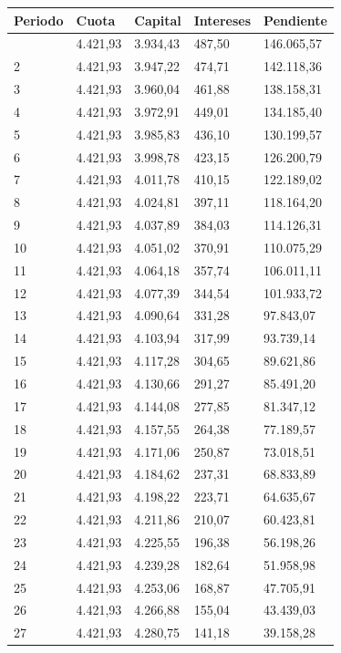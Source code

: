 \documentclass[
  letterpaper,
  DIV=11,
  numbers=noendperiod]{scrreprt}
\begin{document}
\begin{tcolorbox}
\begin{tcolorbox}
\begin{longtable}[]{@{}lllll@{}}
\toprule\noalign{}
Periodo & Cuota & Capital & Intereses & Pendiente \\
\midrule\noalign{}
\endhead
\bottomrule\noalign{}
\endlastfoot
1 & 4.421,93 & 3.934,43 & 487,50 & 146.065,57 \\
2 & 4.421,93 & 3.947,22 & 474,71 & 142.118,36 \\
3 & 4.421,93 & 3.960,04 & 461,88 & 138.158,31 \\
4 & 4.421,93 & 3.972,91 & 449,01 & 134.185,40 \\
5 & 4.421,93 & 3.985,83 & 436,10 & 130.199,57 \\
6 & 4.421,93 & 3.998,78 & 423,15 & 126.200,79 \\
7 & 4.421,93 & 4.011,78 & 410,15 & 122.189,02 \\
8 & 4.421,93 & 4.024,81 & 397,11 & 118.164,20 \\
9 & 4.421,93 & 4.037,89 & 384,03 & 114.126,31 \\
10 & 4.421,93 & 4.051,02 & 370,91 & 110.075,29 \\
11 & 4.421,93 & 4.064,18 & 357,74 & 106.011,11 \\
12 & 4.421,93 & 4.077,39 & 344,54 & 101.933,72 \\
13 & 4.421,93 & 4.090,64 & 331,28 & 97.843,07 \\
14 & 4.421,93 & 4.103,94 & 317,99 & 93.739,14 \\
15 & 4.421,93 & 4.117,28 & 304,65 & 89.621,86 \\
16 & 4.421,93 & 4.130,66 & 291,27 & 85.491,20 \\
17 & 4.421,93 & 4.144,08 & 277,85 & 81.347,12 \\
18 & 4.421,93 & 4.157,55 & 264,38 & 77.189,57 \\
19 & 4.421,93 & 4.171,06 & 250,87 & 73.018,51 \\
20 & 4.421,93 & 4.184,62 & 237,31 & 68.833,89 \\
21 & 4.421,93 & 4.198,22 & 223,71 & 64.635,67 \\
22 & 4.421,93 & 4.211,86 & 210,07 & 60.423,81 \\
23 & 4.421,93 & 4.225,55 & 196,38 & 56.198,26 \\
24 & 4.421,93 & 4.239,28 & 182,64 & 51.958,98 \\
25 & 4.421,93 & 4.253,06 & 168,87 & 47.705,91 \\
26 & 4.421,93 & 4.266,88 & 155,04 & 43.439,03 \\
27 & 4.421,93 & 4.280,75 & 141,18 & 39.158,28 \\

\end{longtable}
\end{tcolorbox}
\end{tcolorbox}
\end{document}

